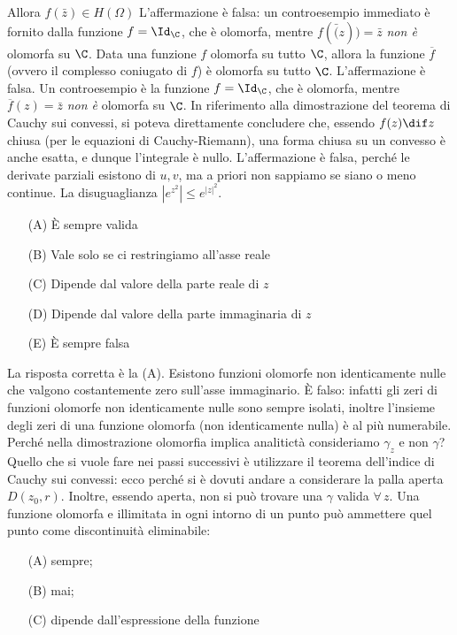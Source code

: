     Allora $f(\bar{z}) \in H(\Omega)$
    L'affermazione è falsa: un controesempio immediato è fornito dalla funzione $ f=\Id_{\C} $, che è olomorfa, mentre $ f(\bar(z))=\bar{z} $ \emph{non è} olomorfa su $ \C $.
    Data una funzione $ f $ olomorfa su tutto $ \C $, allora la funzione $ \overline{f} $ (ovvero il complesso coniugato di $ f $) è olomorfa su tutto $ \C $.
    L'affermazione è falsa. Un controesempio è la funzione $ f =\Id_{\C}  $, che è olomorfa, mentre $ \overline{f}(z)=\bar{z} $ \emph{non è} olomorfa su $ \C $.
    In riferimento alla dimostrazione del teorema di Cauchy sui convessi, si poteva direttamente concludere che, essendo $f(z)\dif z$ chiusa (per le equazioni di Cauchy-Riemann), una forma chiusa su un convesso è anche esatta, e dunque l'integrale è nullo.
    L'affermazione è falsa, perché le derivate parziali esistono di $u, v$, ma a priori non sappiamo se siano o meno continue.
    La disuguaglianza $\left\vert e^{z^2}\right\vert \leq e^{|z|^2}$.
    \begin{itemize}
        \item[(A)] È sempre valida
        \item[(B)] Vale solo se ci restringiamo all'asse reale
        \item[(C)] Dipende dal valore della parte reale di $z$
        \item[(D)] Dipende dal valore della parte immaginaria di $z$
        \item[(E)] È sempre falsa
    \end{itemize}
    La risposta corretta è la (A).
    Esistono funzioni olomorfe non identicamente nulle che valgono costantemente zero sull'asse immaginario.
    È falso: infatti gli zeri di funzioni olomorfe non identicamente nulle sono sempre isolati, inoltre l'insieme degli zeri di una funzione olomorfa (non identicamente nulla) è al più numerabile.
    Perché nella dimostrazione olomorfia implica analitictà consideriamo $\gamma_{z}$ e non $\gamma$?
    Quello che si vuole fare nei passi successivi è utilizzare il teorema dell'indice di Cauchy sui convessi: ecco perché si è dovuti andare a considerare la palla aperta $D(z_{0},r)$. Inoltre, essendo aperta, non si può trovare una $\gamma$ valida $\forall\,{z}$.
    Una funzione olomorfa e illimitata in ogni intorno di un punto può ammettere quel punto come discontinuità eliminabile: \begin{itemize}
        \item[(A)] sempre; 
        \item[(B)] mai; 
        \item[(C)] dipende dall'espressione della funzione
    \end{itemize}
